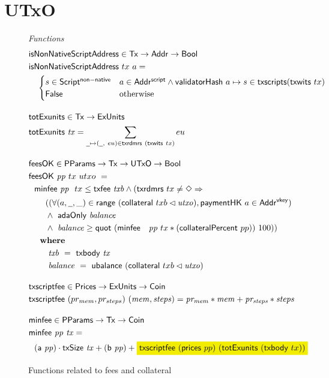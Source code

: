 \section{UTxO}
\label{sec:utxo}

\begin{figure*}[htb]
  \emph{Functions}
  \begin{align*}
    & \fun{isNonNativeScriptAddress} \in \Tx \to \Addr \to \Bool \\
    & \fun{isNonNativeScriptAddress}~tx~a = \\
      &\quad\begin{cases}
        s \in \ScriptNonNative & a \in \AddrScr \land \fun{validatorHash}~a \mapsto s \in \fun{txscripts} (\fun{txwits}~tx) \\
        \False & \text{otherwise}
      \end{cases}
                 \nextdef
    & \fun{totExunits} \in \Tx \to \ExUnits \\
    & \fun{totExunits}~\var{tx} = \sum_{\wcard \mapsto (\wcard, ~eu) \in \fun{txrdmrs}~(\fun{txwits}~tx)} eu
    \nextdef
    & \fun{feesOK} \in \PParams \to \Tx \to \UTxO \to \Bool  \\
    & \fun{feesOK}~\var{pp}~tx~utxo~= \\
    &~~      \minfee{pp}~{tx} \leq \txfee{txb} \wedge (\fun{txrdmrs}~tx \neq \Nothing \Rightarrow \\
    &~~~~~~((\forall (a, \wcard, \_) \in \fun{range}~(\fun{collateral}~{txb} \restrictdom \var{utxo}), \fun{paymentHK}~a \in \AddrVKey) \\
    &~~~~~~\wedge~ \fun{adaOnly}~\var{balance} \\
    &~~~~~~\wedge~ \var{balance} \geq \fun{quot}~(\minfee~{pp}~{tx} * (\fun{collateralPercent}~pp))~100)) \\
    &~~      \where \\
    & ~~~~~~~ \var{txb}~=~\txbody{tx} \\
    & ~~~~~~~ \var{balance}~=~\fun{ubalance}~(\fun{collateral}~{txb} \restrictdom \var{utxo})
    \nextdef
    & \fun{txscriptfee} \in \Prices \to \ExUnits \to \Coin \\
    & \fun{txscriptfee}~(pr_{mem}, pr_{steps})~ (\var{mem, steps})
    = \var{pr_{mem}}*\var{mem} + \var{pr_{steps}}*\var{steps}
    \nextdef
    &\fun{minfee} \in \PParams \to \Tx \to \Coin \\
    &\fun{minfee}~\var{pp}~\var{tx} = \\
    &~~(\fun{a}~\var{pp}) \cdot \fun{txSize}~\var{tx} + (\fun{b}~\var{pp}) +
    \hldiff{\fun{txscriptfee}~(\fun{prices}~{pp})~(\fun{totExunits}~(\fun{txbody}~{tx}))}
  \end{align*}
  \caption{Functions related to fees and collateral}
  \label{fig:functions:utxo}
\end{figure*}

